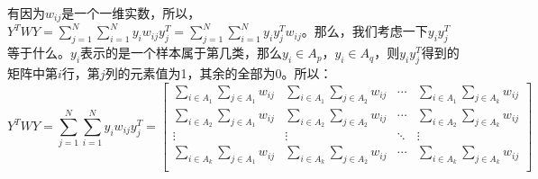 \documentclass[a4paper]{article}
\begin{document}
有因为$w_{ij}$是一个一维实数，所以，$Y^TWY = \sum_{j=1}^N \sum_{i=1}^N y_iw_{ij}y_j^T = \sum_{j=1}^N \sum_{i=1}^N y_iy_j^Tw_{ij}$。那么，我们考虑一下$y_iy_j^T$等于什么。$y_i$表示的是一个样本属于第几类，那么$y_i\in A_p$，$y_i\in A_q$，则$y_iy_j^T$得到的矩阵中第$i$行，第$j$列的元素值为1，其余的全部为0。所以：
\begin{equation}
    Y^TWY = \sum_{j=1}^N \sum_{i=1}^N y_iw_{ij}y_j^T = 
    \begin{bmatrix}
    \sum_{i\in A_1}\sum_{j \in A_1} w_{ij} & \sum_{i\in A_1}\sum_{j \in A_2} w_{ij} & \cdots & \sum_{i\in A_1}\sum_{j \in A_k} w_{ij} \\
    \sum_{i\in A_2}\sum_{j \in A_1} w_{ij} & \sum_{i\in A_2}\sum_{j \in A_2} w_{ij} & \cdots & \sum_{i\in A_2}\sum_{j \in A_k} w_{ij} \\
    \vdots & \vdots & \ddots & \vdots \\
    \sum_{i\in A_k}\sum_{j \in A_1} w_{ij} & \sum_{i\in A_k}\sum_{j \in A_2} w_{ij} & \cdots & \sum_{i\in A_k}\sum_{j \in A_k} w_{ij} \\
    \end{bmatrix}
\end{equation}
\end{document}
